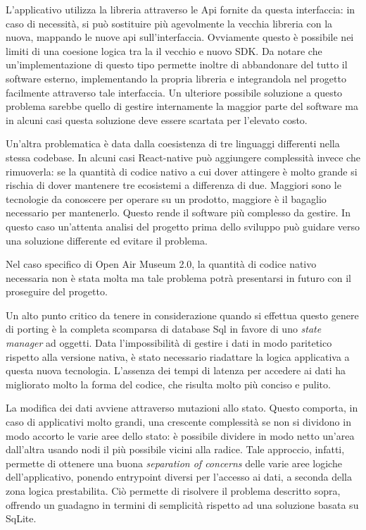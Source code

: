  L’applicativo utilizza la libreria attraverso le Api fornite da questa interfaccia: in caso di necessità, si può sostituire più agevolmente la vecchia libreria con la nuova, mappando le nuove api sull’interfaccia. Ovviamente questo è possibile nei limiti di una coesione logica tra la il vecchio e nuovo SDK. Da notare che un'implementazione di questo tipo permette inoltre di abbandonare del tutto il software esterno, implementando la propria libreria e integrandola nel progetto facilmente attraverso tale interfaccia. Un ulteriore possibile soluzione a questo problema sarebbe quello di gestire internamente la maggior parte del software ma in alcuni casi questa soluzione deve essere scartata per l’elevato costo.\vspace{5mm}

Un'altra problematica è data dalla coesistenza di tre linguaggi differenti nella stessa codebase. In alcuni casi React-native può aggiungere complessità invece che rimuoverla: se la quantità di codice nativo a cui dover attingere è molto grande si rischia di dover mantenere tre ecosistemi a differenza di due. Maggiori sono le tecnologie da conoscere per operare su un prodotto, maggiore è il bagaglio necessario per mantenerlo. Questo rende il software più complesso da gestire. In questo caso un'attenta analisi del progetto prima dello sviluppo può guidare verso una soluzione differente ed evitare il problema.\vspace{5mm}

 Nel caso specifico di Open Air Museum 2.0, la quantità di codice nativo necessaria non è stata molta ma tale problema potrà presentarsi in futuro con il proseguire del progetto.\vspace{5mm}

Un alto punto critico da tenere in considerazione quando si effettua questo genere di porting è la completa scomparsa di database Sql in favore di uno \emph{state manager} ad oggetti. Data l'impossibilità di gestire i dati in modo paritetico rispetto alla versione nativa, è stato necessario riadattare la logica applicativa a questa nuova tecnologia. L'assenza dei tempi di latenza per accedere ai dati ha migliorato molto la forma del codice, che risulta molto più conciso e pulito.\vspace{5mm}

 La modifica dei dati avviene attraverso mutazioni allo stato. Questo comporta, in caso di applicativi molto grandi, una crescente complessità se non si dividono in modo accorto le varie aree dello stato: è possibile dividere in modo netto un'area dall'altra usando nodi il più possibile vicini alla radice. Tale approccio, infatti, permette di ottenere una buona \emph{separation of concerns}\cite{SOC} delle varie aree logiche dell'applicativo, ponendo entrypoint diversi per l'accesso ai dati, a seconda della zona logica prestabilita. Ciò permette di risolvere il problema descritto sopra, offrendo un guadagno in termini di semplicità rispetto ad una soluzione basata su SqLite.

